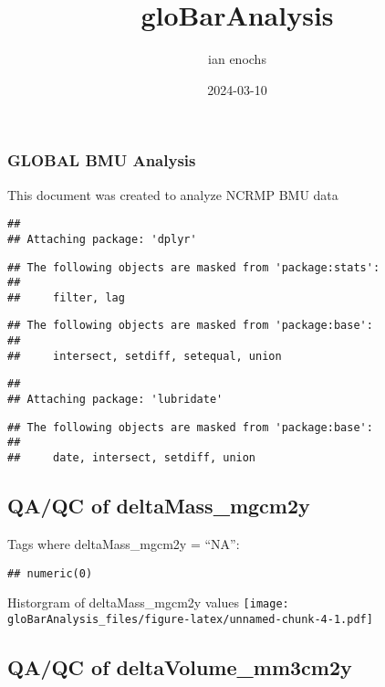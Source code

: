 \documentclass[
]{article}
\title{gloBarAnalysis}
\author{ian enochs}
\date{2024-03-10}
\begin{document}
\maketitle

\hypertarget{global-bmu-analysis}{%
\subsubsection{GLOBAL BMU Analysis}\label{global-bmu-analysis}}

This document was created to analyze NCRMP BMU data

\begin{verbatim}
## 
## Attaching package: 'dplyr'
\end{verbatim}

\begin{verbatim}
## The following objects are masked from 'package:stats':
## 
##     filter, lag
\end{verbatim}

\begin{verbatim}
## The following objects are masked from 'package:base':
## 
##     intersect, setdiff, setequal, union
\end{verbatim}

\begin{verbatim}
## 
## Attaching package: 'lubridate'
\end{verbatim}

\begin{verbatim}
## The following objects are masked from 'package:base':
## 
##     date, intersect, setdiff, union
\end{verbatim}

\hypertarget{qaqc-of-deltamass_mgcm2y}{%
\subsection{QA/QC of deltaMass\_mgcm2y}\label{qaqc-of-deltamass_mgcm2y}}

Tags where deltaMass\_mgcm2y = ``NA'':

\begin{verbatim}
## numeric(0)
\end{verbatim}

Historgram of deltaMass\_mgcm2y values
\texttt{[image: gloBarAnalysis\_files/figure-latex/unnamed-chunk-4-1.pdf]}

\hypertarget{qaqc-of-deltavolume_mm3cm2y}{%
\subsection{QA/QC of
deltaVolume\_mm3cm2y}\label{qaqc-of-deltavolume_mm3cm2y}}
\end{document}
